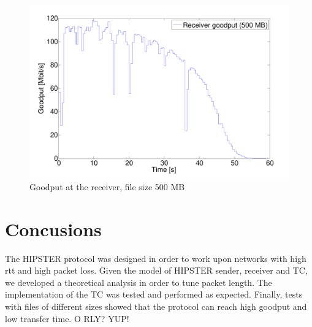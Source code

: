 \documentclass[10pt,twocolumn]{article}
\begin{document}
\begin{figure}[htp]
  \centering
  \includegraphics[width = 0.95\columnwidth, keepaspectratio]{tex/images/goodput_c1_500.pdf}
  \caption{Goodput at the receiver, file size 500 MB}
  \label{fig:goodput_500}
\end{figure}

\section{Concusions}
The HIPSTER protocol was designed in order to work upon networks with high rtt and high packet loss. Given the model of HIPSTER sender, receiver and TC, we developed a theoretical analysis in order to tune packet length. The implementation of the TC was tested and performed as expected. Finally, tests with files of different sizes showed that the protocol can reach high goodput and low transfer time.
O RLY? YUP!
\end{document}
